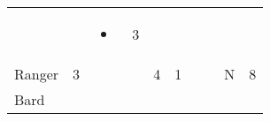 \documentclass[12pt]{article}
\newcommand{\indexClass}[1]{\index{#1}}
\newcommand{\class}[1]{#1\indexClass{#1}}
\begin{document}
\begin{longtable}[]{@{}llllllllll@{}}
\begin{minipage}[t]{0.06\columnwidth}\raggedright\strut
\strut\end{minipage} &
\begin{minipage}[t]{0.06\columnwidth}\raggedright\strut
\strut\end{minipage} &
\begin{minipage}[t]{0.07\columnwidth}\raggedright\strut
\begin{itemize}
\item
\end{itemize}
\strut\end{minipage} &
\begin{minipage}[t]{0.08\columnwidth}\raggedright\strut
3
\strut\end{minipage}\tabularnewline
\begin{minipage}[t]{0.13\columnwidth}\raggedright\strut
\class{Ranger}
\strut\end{minipage} &
\begin{minipage}[t]{0.06\columnwidth}\raggedright\strut
3
\strut\end{minipage} &
\begin{minipage}[t]{0.06\columnwidth}\raggedright\strut
\strut\end{minipage} &
\begin{minipage}[t]{0.06\columnwidth}\raggedright\strut
\strut\end{minipage} &
\begin{minipage}[t]{0.06\columnwidth}\raggedright\strut
4
\strut\end{minipage} &
\begin{minipage}[t]{0.06\columnwidth}\raggedright\strut
1
\strut\end{minipage} &
\begin{minipage}[t]{0.06\columnwidth}\raggedright\strut
\strut\end{minipage} &
\begin{minipage}[t]{0.06\columnwidth}\raggedright\strut
\strut\end{minipage} &
\begin{minipage}[t]{0.07\columnwidth}\raggedright\strut
N
\strut\end{minipage} &
\begin{minipage}[t]{0.08\columnwidth}\raggedright\strut
8
\strut\end{minipage}\tabularnewline
\begin{minipage}[t]{0.13\columnwidth}\raggedright\strut
\class{Bard}
\strut\end{minipage} &

\end{longtable}
\end{document}
